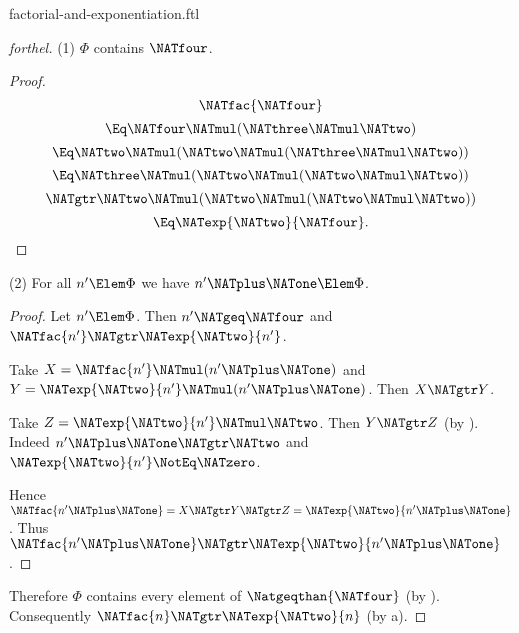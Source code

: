 \documentclass{stex}
\begin{document}
\begin{smodule}{factorial-and-exponentiation.ftl}
\begin{proof}[forthel]
  (1) $\Phi$ contains $\NATfour$.
  \begin{proof}
    \[  \NATfac{\NATfour}                                  \]
    \[    \Eq \NATfour \NATmul (\NATthree \NATmul \NATtwo)             \]
    \[    \Eq \NATtwo \NATmul (\NATtwo \NATmul (\NATthree \NATmul \NATtwo))   \]
    \[    \Eq \NATthree \NATmul (\NATtwo \NATmul (\NATtwo \NATmul \NATtwo))   \]
    \[    \NATgtr \NATtwo \NATmul (\NATtwo \NATmul (\NATtwo \NATmul \NATtwo))   \]
    \[    \Eq \NATexp{\NATtwo}{\NATfour}.                          \]
  \end{proof}

  (2) For all $n' \Elem \Phi$ we have $n' \NATplus \NATone \Elem \Phi$.
  \begin{proof}
    Let $n' \Elem \Phi$.
    Then $n' \NATgeq \NATfour$ and $\NATfac{n'} \NATgtr \NATexp{\NATtwo}{n'}$.

    Take $X = \NATfac{n'} \NATmul (n' \NATplus \NATone)$ and $Y = \NATexp{\NATtwo}{n'} \NATmul (n' \NATplus \NATone)$.
    Then $X \NATgtr Y$.

    Take $Z = \NATexp{\NATtwo}{n'} \NATmul \NATtwo$.
    Then $Y \NATgtr Z$ (by ).
    Indeed $n' \NATplus \NATone \NATgtr \NATtwo$ and $\NATexp{\NATtwo}{n'} \NotEq \NATzero$.

    Hence $\NATfac{n' \NATplus \NATone} = X \NATgtr Y \NATgtr Z = \NATexp{\NATtwo}{n' \NATplus \NATone}$.
    Thus $\NATfac{n' \NATplus \NATone} \NATgtr \NATexp{\NATtwo}{n' \NATplus \NATone}$.
  \end{proof}

  Therefore $\Phi$ contains every element of $\Natgeqthan{\NATfour}$ (by ).
  Consequently $\NATfac{n} \NATgtr \NATexp{\NATtwo}{n}$ (by a).
\end{proof}
\end{smodule}
\end{document}
